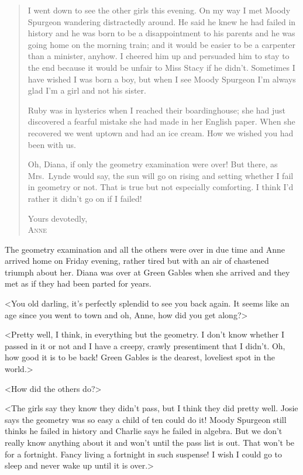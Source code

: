 \begin{quotation}
I went down to see the other girls this evening. On my way I met Moody Spurgeon wandering distractedly around. He said he knew he had failed in history and he was born to be a disappointment to his parents and he was going home on the morning train; and it would be easier to be a carpenter than a minister, anyhow. I cheered him up and persuaded him to stay to the end because it would be unfair to Miss Stacy if he didn't. Sometimes I have wished I was born a boy, but when I see Moody Spurgeon I'm always glad I'm a girl and not his sister.

Ruby was in hysterics when I reached their boardinghouse; she had just discovered a fearful mistake she had made in her English paper. When she recovered we went uptown and had an ice cream. How we wished you had been with us.

Oh, Diana, if only the geometry examination were over! But there, as Mrs.~Lynde would say, the sun will go on rising and setting whether I fail in geometry or not. That is true but not especially comforting. I think I'd rather it didn't go on if I failed!
\begin{flushright}
Yours devotedly,\\
\textsc{Anne}
\end{flushright}
\end{quotation}

The geometry examination and all the others were over in due time and Anne arrived home on Friday evening, rather tired but with an air of chastened triumph about her. Diana was over at Green Gables when she arrived and they met as if they had been parted for years.

<You old darling, it's perfectly splendid to see you back again. It seems like an age since you went to town and oh, Anne, how did you get along?>

<Pretty well, I think, in everything but the geometry. I don't know whether I passed in it or not and I have a creepy, crawly presentiment that I didn't. Oh, how good it is to be back! Green Gables is the dearest, loveliest spot in the world.>

<How did the others do?>

<The girls say they know they didn't pass, but I think they did pretty well. Josie says the geometry was so easy a child of ten could do it! Moody Spurgeon still thinks he failed in history and Charlie says he failed in algebra. But we don't really know anything about it and won't until the pass list is out. That won't be for a fortnight. Fancy living a fortnight in such suspense! I wish I could go to sleep and never wake up until it is over.>

